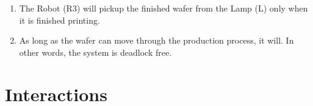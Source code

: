 \documentclass[a4paper,12pt]{article}
\begin{document}
\begin{enumerate}
\item The Robot (R3) will pickup the finished wafer from the Lamp (L) only when it is finished printing.




\item As long as the wafer can move through the production process, it will. In other words, the system is deadlock free.

\end{enumerate}

\newpage
\section{Interactions} 
\end{document}
